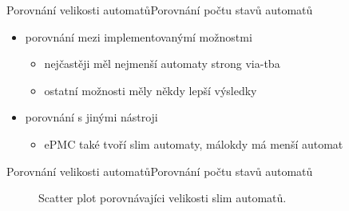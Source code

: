 \documentclass[
]{beamer}
\begin{document}
\begin{frame}{Porovnání velikosti automatů}{Porovnání počtu stavů automatů}
	
	\begin{itemize}
		\item porovnání mezi implementovanýmí možnostmi
		\begin{itemize}
			
			\pause
			\item nejčastěji měl nejmenší automaty strong via-tba
			\pause
			\item ostatní možnosti měly někdy lepší výsledky
		\end{itemize}
	 	\pause
		\item porovnání s jinými nástroji
		\begin{itemize}
			\item ePMC také tvoří slim automaty, málokdy má menší automat
			
		\end{itemize}
	\end{itemize}
\end{frame}
	
	\begin{frame}{Porovnání velikosti automatů}{Porovnání počtu stavů automatů}
		\begin{figure}[ht]
			\centering
			
			\caption{Scatter plot porovnávajíci velikosti slim automatů. }
			\label{scatter:slim-epmc}
			\begin{tikzpicture}
				
			\end{tikzpicture}
		\end{figure}
	\end{frame}
	
\end{document}
